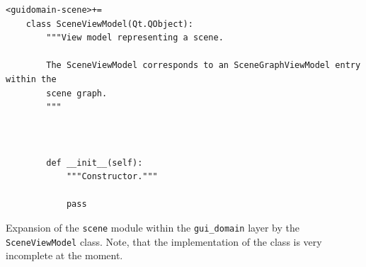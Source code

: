 \documentclass[10pt, openright, notitlepage]{scrreprt}
\begin{document}
\begin{listing}[H]
\begin{verbatim}
<guidomain-scene>+=
    class SceneViewModel(Qt.QObject):
        """View model representing a scene.
    
        The SceneViewModel corresponds to an SceneGraphViewModel entry within the
        scene graph.
        """
    
        
    
        def __init__(self):
            """Constructor."""
        
            pass
\end{verbatim}
\caption{\label{lst:guidomain-scene-sceneviewmodel}
Expansion of the \texttt{scene} module within the \texttt{gui\_domain} layer by the \texttt{SceneViewModel} class. Note, that the implementation of the class is very incomplete at the moment.}
\end{listing}

\begin{center}
\end{center}

\begin{center}
\end{center}

\begin{center}
\end{center}

\begin{center}
\end{center}
\end{document}
